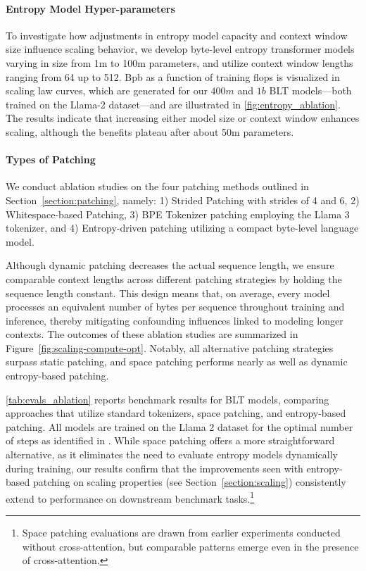\paragraph{Entropy Model Hyper-parameters} To investigate how adjustments in entropy model capacity and context window size influence scaling behavior, we develop byte-level entropy transformer models varying in size from 1m to 100m parameters, and utilize context window lengths ranging from 64 up to 512. Bpb as a function of training flops is visualized in scaling law curves, which are generated for our $400m$ and $1b$ {\textsc BLT} models—both trained on the Llama-2 dataset—and are illustrated in \autoref{fig:entropy_ablation}. The results indicate that increasing either model size or context window enhances scaling, although the benefits plateau after about 50m parameters.

\paragraph{Types of Patching}

We conduct ablation studies on the four patching methods outlined in Section~\ref{section:patching}, namely: 1) Strided Patching with strides of 4 and 6, 2) Whitespace-based Patching, 3) BPE Tokenizer patching employing the Llama 3 tokenizer, and 4) Entropy-driven patching utilizing a compact byte-level language model.

Although dynamic patching decreases the actual sequence length, we ensure comparable context lengths across different patching strategies by holding the sequence length constant. This design means that, on average, every model processes an equivalent number of bytes per sequence throughout training and inference, thereby mitigating confounding influences linked to modeling longer contexts. The outcomes of these ablation studies are summarized in Figure~\ref{fig:scaling-compute-opt}. Notably, all alternative patching strategies surpass static patching, and space patching performs nearly as well as dynamic entropy-based patching.

\autoref{tab:evals_ablation} reports benchmark results for {\textsc BLT} models, comparing approaches that utilize standard tokenizers, space patching, and entropy-based patching. All models are trained on the Llama 2 dataset for the optimal number of steps as identified in \citet{dubey2024llama}. While space patching offers a more straightforward alternative, as it eliminates the need to evaluate entropy models dynamically during training, our results confirm that the improvements seen with entropy-based patching on scaling properties (see Section~\ref{section:scaling}) consistently extend to performance on downstream benchmark tasks.\footnote{Space patching evaluations are drawn from earlier experiments conducted without cross-attention, but comparable patterns emerge even in the presence of cross-attention.}

